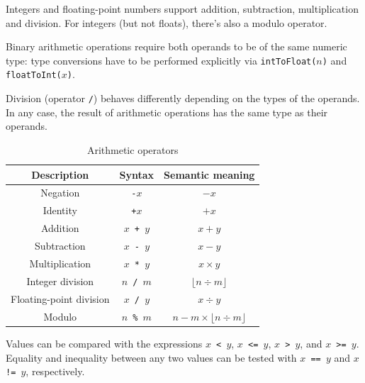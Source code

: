 \documentclass[UdineBachThesis,american,11pt]{PhdThesis}
\begin{document}
  Integers and floating-point numbers support addition, subtraction,
  multiplication and division. For integers (but not floats), there's also a
  modulo operator.

  Binary arithmetic operations require both operands to be of the same numeric
  type: type conversions have to be performed explicitly via
  \mbox{\texttt{intToFloat($n$)}} and \mbox{\texttt{floatToInt($x$)}}.

  Division (operator \texttt{/}) behaves differently depending on the types of
  the operands. In any case, the result of arithmetic operations has the same
  type as their operands.

  \begin{table}[H]
    \centering

    \begin{tabular}{|c|c|c|}
      \hline

      Description &
      Syntax &
      Semantic meaning \\
      \hline

      Negation &
      \texttt{-$x$} &
      $-x$ \\

      Identity &
      \texttt{+$x$} &
      $+x$ \\

      Addition &
      \texttt{$x$ + $y$} &
      $x + y$ \\

      Subtraction &
      \texttt{$x$ - $y$} &
      $x - y$ \\

      Multiplication &
      \texttt{$x$ * $y$} &
      $x \times y$ \\

      Integer division &
      \texttt{$n$ / $m$} &
      $\lfloor n \div m \rfloor$ \\

      Floating-point division &
      \texttt{$x$ / $y$} &
      $x \div y$ \\

      Modulo &
      \texttt{$n$ \% $m$} &
      $n - m \times \lfloor n \div m \rfloor$ \\
      \hline
    \end{tabular}

    \caption{Arithmetic operators}
  \end{table}

  Values can be compared with the expressions \mbox{\texttt{$x$ < $y$}},
  \mbox{\texttt{$x$ <= $y$}}, \mbox{\texttt{$x$ > $y$}}, and
  \mbox{\texttt{$x$ >= $y$}}. Equality and inequality between any two values can
  be tested with \mbox{\texttt{$x$ == $y$}} and \mbox{\texttt{$x$ != $y$}},
  respectively.
\end{document}
